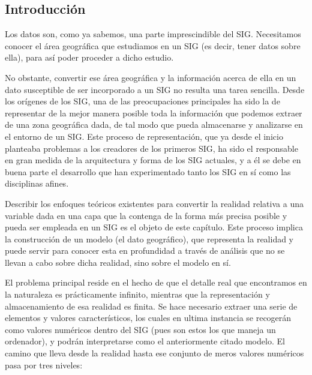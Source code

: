 \begin{multicols}{2}

\section{Introducción}
\pagestyle{fancy}

Los datos son, como ya sabemos, una parte imprescindible del SIG. Necesitamos conocer el área geográfica que estudiamos en un SIG (es decir, tener datos sobre ella), para así poder proceder a dicho estudio. 

No obstante, convertir ese área geográfica y la información acerca de ella en un dato susceptible de ser incorporado a un SIG no resulta una tarea sencilla. Desde los orígenes de los SIG, una de las preocupaciones principales ha sido la de representar de la mejor manera posible toda la información que podemos extraer de una zona geográfica dada, de tal modo que pueda almacenarse y analizarse en el entorno de un SIG. Este proceso de representación, que ya desde el inicio planteaba problemas a los creadores de los primeros SIG, ha sido el responsable en gran medida de la arquitectura y forma de los SIG actuales, y a él se debe en buena parte el desarrollo que han experimentado tanto los SIG en sí como las disciplinas afines.

Describir los enfoques teóricos existentes para convertir la realidad relativa a una variable dada en una capa que la contenga de la forma más precisa posible y pueda ser empleada en un SIG es el objeto de este capítulo. Este proceso implica la construcción de un modelo (el dato geográfico), que representa la realidad y puede servir para conocer esta en profundidad a través de análisis que no se llevan a cabo sobre dicha realidad, sino sobre el modelo en sí.

El problema principal reside en el hecho de que el detalle real que encontramos en la naturaleza es prácticamente infinito, mientras que la representación y almacenamiento de esa realidad es finita. Se hace necesario extraer una serie de elementos y valores característicos, los cuales en ultima instancia se recogerán como valores numéricos dentro del SIG (pues son estos los que maneja un ordenador), y podrán interpretarse como el anteriormente citado modelo. El camino que lleva desde la realidad hasta ese conjunto de meros valores numéricos pasa por tres niveles:


\end{multicols}
